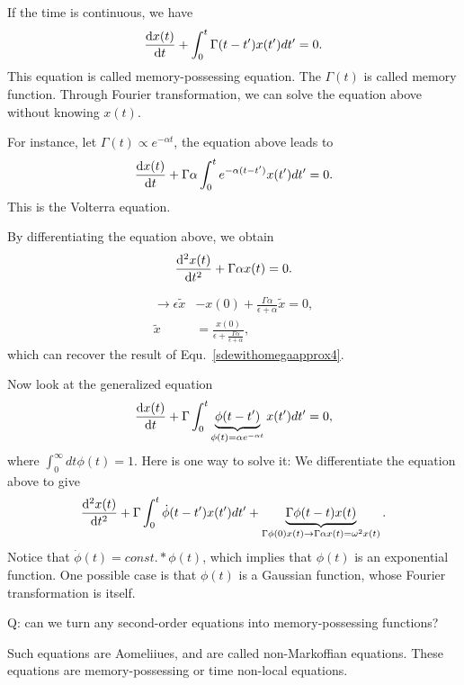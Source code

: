 
If the time is continuous, we have
\begin{align}
\frac{{\mathrm d} {x(t)}}{{\mathrm d}t}+ \int_0^t \Gamma(t-t') x(t')dt'=0.
\end{align}
This equation is called memory-possessing equation. The $ \Gamma(t) $ is called memory function. Through Fourier transformation, we can solve the equation above without knowing $ x(t) $. 

For instance, let $ \Gamma(t) \propto e^{-\alpha t} $, the equation above leads to 
\begin{align}
\frac{{\mathrm d} {x(t)}}{{\mathrm d}t}+ \Gamma \alpha \int_0^t e^{-\alpha (t-t')} x(t')dt'=0.
\end{align}
This is the Volterra equation. 

By differentiating the equation above, we obtain
\begin{align}
\frac{{\mathrm d}^2 {x(t)}}{{\mathrm d}t^2}+ \Gamma \alpha x (t)= 0.
\end{align}

\begin{align}
\rightarrow \epsilon \tilde{x} &-x(0)+ \frac{\Gamma \alpha}{\epsilon +\alpha}\tilde{x}=0,\\
\tilde{x} & = \frac{x(0)}{\epsilon + \frac{\Gamma \alpha}{\epsilon + \alpha}},
\end{align}
which can recover the result of Equ.~\eqref{sdewithomegaapprox4}.

Now look at the generalized equation
\begin{align}
\frac{{\mathrm d} {x(t)}}{{\mathrm d}t}+ \Gamma \int_0^t \underbrace{\phi (t-t')}_{\phi(t)=\alpha e^{-\alpha t}}x(t')dt' =0,
\end{align}
where $ \int_0^\infty dt \phi(t)=1 $. Here is one way to solve it:
We differentiate the equation above to give
\begin{align}
\frac{{\mathrm d}^2 {x(t)}}{{\mathrm d}t^2}+ \Gamma \int_0^t \dot{\phi}(t-t')x(t')dt'
+ \underbrace{\Gamma \phi(t-t)x(t)}_{\Gamma \phi(0)x(t) \rightarrow \Gamma\alpha x(t)=\omega^2 x(t)}.
\end{align} 
Notice that $ \dot{\phi}(t)=const.*\phi(t) $, which implies that $ \phi(t) $ is an exponential function. One possible case is that $ \phi(t) $ is a Gaussian function, whose Fourier transformation is itself. 

Q: can we turn any second-order equations into memory-possessing functions? 

Such equations are Aomeliiues, and are called non-Markoffian equations. These equations are memory-possessing or time non-local equations. 

